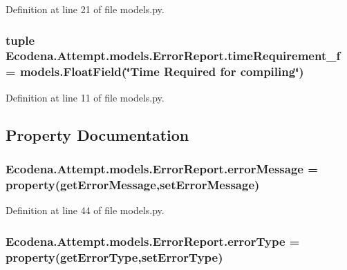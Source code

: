 Definition at line 21 of file models.py.

\hypertarget{class_ecodena_1_1_attempt_1_1models_1_1_error_report_aafea830ed4b75d8af62b447a58a23fdb}{
\subsubsection[{timeRequirement\_\-f}]{\setlength{\rightskip}{0pt plus 5cm}tuple {\bf Ecodena.Attempt.models.ErrorReport.timeRequirement\_\-f} = models.FloatField(\char`\"{}Time Required for compiling\char`\"{})}}
\label{df/d02/class_ecodena_1_1_attempt_1_1models_1_1_error_report_aafea830ed4b75d8af62b447a58a23fdb}


Definition at line 11 of file models.py.



\subsection{Property Documentation}
\hypertarget{class_ecodena_1_1_attempt_1_1models_1_1_error_report_a56aeca1efa6009ebf80c53d118e4f5eb}{
\subsubsection[{errorMessage}]{\setlength{\rightskip}{0pt plus 5cm}Ecodena.Attempt.models.ErrorReport.errorMessage = property(getErrorMessage,setErrorMessage)}}
\label{df/d02/class_ecodena_1_1_attempt_1_1models_1_1_error_report_a56aeca1efa6009ebf80c53d118e4f5eb}


Definition at line 44 of file models.py.

\hypertarget{class_ecodena_1_1_attempt_1_1models_1_1_error_report_a76dd2e9f06b5ba04cf47e088bc4b47b4}{
\subsubsection[{errorType}]{\setlength{\rightskip}{0pt plus 5cm}Ecodena.Attempt.models.ErrorReport.errorType = property(getErrorType,setErrorType)}}
\label{df/d02/class_ecodena_1_1_attempt_1_1models_1_1_error_report_a76dd2e9f06b5ba04cf47e088bc4b47b4}


